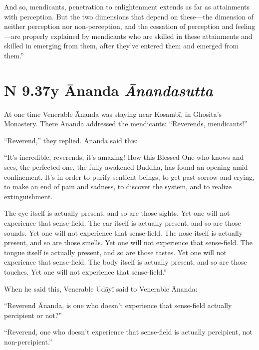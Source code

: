 \documentclass[12pt,openany]{book}%
\newcommand*{\suttatitleacronym}[1]{\smaller[2]{#1}\vspace*{.3em}}
\newcommand*{\suttatitletranslation}[1]{\linebreak{#1}}
\newcommand*{\suttatitleroot}[1]{\linebreak\smaller[2]\itshape{#1}}
\newcommand*{\tocacronym}[1]{\hspace*{-3.3em}{#1}\quad}
\newcommand*{\toctranslation}[1]{#1}
\newcommand*{\tocroot}[1]{(\textit{#1})}
\begin{document}
And so, mendicants, penetration to enlightenment extends as far as attainments with perception. But the two dimensions that depend on these—the dimension of neither perception nor non-perception, and the cessation of perception and feeling—are properly explained by mendicants who are skilled in these attainments and skilled in emerging from them, after they’ve entered them and emerged from them.” 

%
\section*{{\suttatitleacronym AN 9.37}{\suttatitletranslation By Ānanda }{\suttatitleroot Ānandasutta}}
\addcontentsline{toc}{section}{\tocacronym{AN 9.37} \toctranslation{By Ānanda } \tocroot{Ānandasutta}}

At one time Venerable Ānanda was staying near \textsanskrit{Kosambī}, in Ghosita’s Monastery. There Ānanda addressed the mendicants: “Reverends, mendicants!” 

“Reverend,” they replied. Ānanda said this: 

“It’s incredible, reverends, it’s amazing! How this Blessed One who knows and sees, the perfected one, the fully awakened Buddha, has found an opening amid confinement. It’s in order to purify sentient beings, to get past sorrow and crying, to make an end of pain and sadness, to discover the system, and to realize extinguishment. 

The eye itself is actually present, and so are those sights. Yet one will not experience that sense-field. The ear itself is actually present, and so are those sounds. Yet one will not experience that sense-field. The nose itself is actually present, and so are those smells. Yet one will not experience that sense-field. The tongue itself is actually present, and so are those tastes. Yet one will not experience that sense-field. The body itself is actually present, and so are those touches. Yet one will not experience that sense-field.” 

When he said this, Venerable \textsanskrit{Udāyī} said to Venerable Ānanda: 

“Reverend Ānanda, is one who doesn’t experience that sense-field actually percipient or not?” 

“Reverend, one who doesn’t experience that sense-field is actually percipient, not non-percipient.” 
\end{document}
